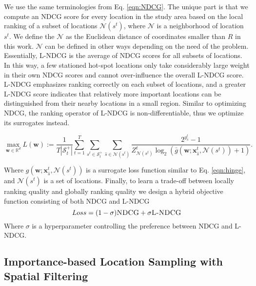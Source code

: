 \documentclass{article}
\def \S {\mathbf{S}}
\def \R {\mathbb{R}}
\def \w {\mathbf{w}}
\def \x {\mathbf{x}}
\def \x {\mathbf{x}}
\def \x {\mathbf{x}}
\def \w {\mathbf{w}}
\def \R {\mathbb{R}}
\def \S {\mathcal{S}}
\def \N {\mathcal{N}}
\begin{document}
We use the same terminologies from Eq. \ref{eqn:NDCG}. The unique part is that we compute an NDCG score for every location in the study area based on the local ranking of a subset of locations $\N(s^t)$, where $\N$ is a neighborhood of location $s^t$. We define the $\N$ as the Euclidean distance of coordinates smaller than $R$ in this work. $\N$ can be defined in other ways depending on the need of the problem. Essentially, L-NDCG is the average of NDCG scores for all subsets of locations. In this way, a few stationed hot-spot locations only take considerably large weight in their own NDCG scores and cannot over-influence the overall L-NDCG score.  L-NDCG emphasizes ranking correctly on each subset of locations, and a greater L-NDCG score indicates that relatively more important locations can be distinguished from their nearby locations in a small region. Similar to optimizing NDCG, the ranking operator of L-NDCG is non-differentiable, thus we optimize its surrogates instead.

\begin{equation} \label{eqn:LNDCG2}
\max_{\w\in\R^d} L(\w):=\frac{1}{T{|\S^+_t|}}\sum_{t=1}^T\sum_{s^t\in \S^+_t} \sum_{\hat{s}\in \N(s^t)} \frac{2^{y^t_{\hat{s}}}-1}{Z^t_{\N(s^t)}\log_2(\bar g(\w; \x^t_{\hat{s}}, \N(s^t))+1)}.
\end{equation}

Where $g(\w; \x^t_{\hat{s}}, \N(s^t))$ is a surrogate loss function similar to Eq. \ref{eqn:hinge}, and $\N(s^t)$ is a set of locations. Finally, to learn a trade-off between locally ranking quality and globally ranking quality we design a hybrid objective function consisting of both NDCG and L-NDCG
\begin{equation} \label{eqn:hybrid}
Loss = (1 - \sigma)\textsc{NDCG} + \sigma \textsc{L-NDCG}
\end{equation}
\vspace{-0.1in}
Where $\sigma$ is a hyperparameter controlling the preference between NDCG and L-NDCG.

\subsection{Importance-based Location Sampling with Spatial Filtering}
\end{document}
